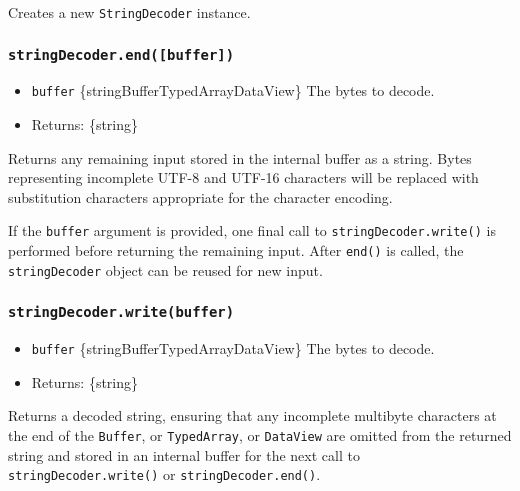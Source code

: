 Creates a new \texttt{StringDecoder} instance.

\subsubsection{\texorpdfstring{\texttt{stringDecoder.end({[}buffer{]})}}{stringDecoder.end({[}buffer{]})}}\label{stringdecoder.endbuffer}

\begin{itemize}
\tightlist
\item
  \texttt{buffer}
  \{string\textbar Buffer\textbar TypedArray\textbar DataView\} The
  bytes to decode.
\item
  Returns: \{string\}
\end{itemize}

Returns any remaining input stored in the internal buffer as a string.
Bytes representing incomplete UTF-8 and UTF-16 characters will be
replaced with substitution characters appropriate for the character
encoding.

If the \texttt{buffer} argument is provided, one final call to
\texttt{stringDecoder.write()} is performed before returning the
remaining input. After \texttt{end()} is called, the
\texttt{stringDecoder} object can be reused for new input.

\subsubsection{\texorpdfstring{\texttt{stringDecoder.write(buffer)}}{stringDecoder.write(buffer)}}\label{stringdecoder.writebuffer}

\begin{itemize}
\tightlist
\item
  \texttt{buffer}
  \{string\textbar Buffer\textbar TypedArray\textbar DataView\} The
  bytes to decode.
\item
  Returns: \{string\}
\end{itemize}

Returns a decoded string, ensuring that any incomplete multibyte
characters at the end of the \texttt{Buffer}, or \texttt{TypedArray}, or
\texttt{DataView} are omitted from the returned string and stored in an
internal buffer for the next call to \texttt{stringDecoder.write()} or
\texttt{stringDecoder.end()}.

